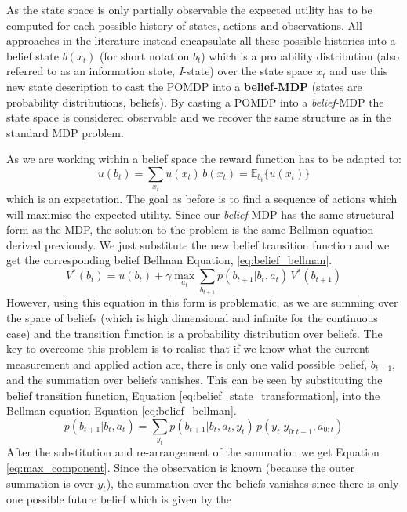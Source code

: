 As the state space is only partially observable the expected utility has to be computed for each possible history of states, actions and observations.
All approaches in the literature instead encapsulate all these possible histories into a belief state $b(x_t)$ (for short notation $b_t$)
which is a probability distribution (also referred to as an information state, \textit{I}-state) over the state 
space $x_t$ and use this new state description to cast the POMDP into a \textbf{belief-MDP} (states are probability distributions, 
beliefs). By casting a POMDP into a \textit{belief}-MDP the state space is considered observable and we recover the same structure 
as in the standard MDP problem.

As we are working within a belief space the reward function has to be adapted to:
\begin{equation}
  u(b_t) = \sum_{x_t} u(x_t)\, b(x_t) = \mathbb{E}_{b_t}\{u(x_t)\}
\end{equation}
which is an expectation. The goal as before is to find a sequence of actions 
which will maximise the expected utility. Since our \textit{belief}-MDP has the same structural form as the MDP, the solution 
to the problem is the same Bellman equation derived previously. We just substitute the new belief transition function 
and we get the corresponding belief Bellman Equation, \ref{eq:belief_bellman}.
\begin{equation}\label{eq:belief_bellman}
 V^*(b_t) = u(b_t) + \gamma \max_{a_t} \sum_{b_{t+1}} p(b_{t+1}|b_t,a_t)\,V^*(b_{t+1})
\end{equation}
However, using this equation in this form is problematic, as we are summing over the space of beliefs (which is high dimensional 
and infinite for the continuous case) and the transition function is a probability distribution over beliefs. 
The key to overcome this problem is to realise that if we know what the current measurement and applied action are, 
there is only one valid possible belief, $b_{t+1}$, and
the summation over beliefs vanishes. This can be seen by substituting the belief transition function,
Equation \ref{eq:belief_state_transformation}, into the Bellman equation Equation \ref{eq:belief_bellman}.
\begin{equation}\label{eq:belief_state_transformation}
 p(b_{t+1}|b_t,a_t) = \sum_{y_t} p(b_{t+1}|b_t,a_t,y_t)\,p(y_t|y_{0:t-1},a_{0:t})
\end{equation}
After the substitution and re-arrangement of the summation we get Equation \ref{eq:max_component}. 
Since the observation is known (because the outer summation is over $y_t$), the summation over the beliefs vanishes since there is only one possible future belief which is given by the 
